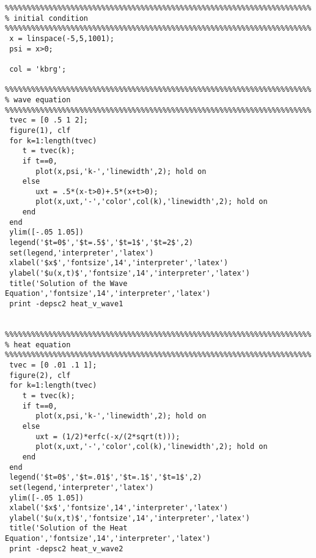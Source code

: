 {\small\begin{verbatim}
%%%%%%%%%%%%%%%%%%%%%%%%%%%%%%%%%%%%%%%%%%%%%%%%%%%%%%%%%%%%%%%%%%%%%%
% initial condition
%%%%%%%%%%%%%%%%%%%%%%%%%%%%%%%%%%%%%%%%%%%%%%%%%%%%%%%%%%%%%%%%%%%%%%
 x = linspace(-5,5,1001);
 psi = x>0;

 col = 'kbrg';

%%%%%%%%%%%%%%%%%%%%%%%%%%%%%%%%%%%%%%%%%%%%%%%%%%%%%%%%%%%%%%%%%%%%%%
% wave equation
%%%%%%%%%%%%%%%%%%%%%%%%%%%%%%%%%%%%%%%%%%%%%%%%%%%%%%%%%%%%%%%%%%%%%%
 tvec = [0 .5 1 2];
 figure(1), clf
 for k=1:length(tvec)
    t = tvec(k);
    if t==0, 
       plot(x,psi,'k-','linewidth',2); hold on
    else
       uxt = .5*(x-t>0)+.5*(x+t>0);
       plot(x,uxt,'-','color',col(k),'linewidth',2); hold on
    end
 end
 ylim([-.05 1.05])
 legend('$t=0$','$t=.5$','$t=1$','$t=2$',2)
 set(legend,'interpreter','latex')
 xlabel('$x$','fontsize',14','interpreter','latex')
 ylabel('$u(x,t)$','fontsize',14','interpreter','latex')
 title('Solution of the Wave Equation','fontsize',14','interpreter','latex')
 print -depsc2 heat_v_wave1


%%%%%%%%%%%%%%%%%%%%%%%%%%%%%%%%%%%%%%%%%%%%%%%%%%%%%%%%%%%%%%%%%%%%%%
% heat equation
%%%%%%%%%%%%%%%%%%%%%%%%%%%%%%%%%%%%%%%%%%%%%%%%%%%%%%%%%%%%%%%%%%%%%%
 tvec = [0 .01 .1 1];
 figure(2), clf
 for k=1:length(tvec)
    t = tvec(k);
    if t==0, 
       plot(x,psi,'k-','linewidth',2); hold on
    else
       uxt = (1/2)*erfc(-x/(2*sqrt(t)));
       plot(x,uxt,'-','color',col(k),'linewidth',2); hold on
    end
 end
 legend('$t=0$','$t=.01$','$t=.1$','$t=1$',2)
 set(legend,'interpreter','latex')
 ylim([-.05 1.05])
 xlabel('$x$','fontsize',14','interpreter','latex')
 ylabel('$u(x,t)$','fontsize',14','interpreter','latex')
 title('Solution of the Heat Equation','fontsize',14','interpreter','latex')
 print -depsc2 heat_v_wave2

\end{verbatim}}
